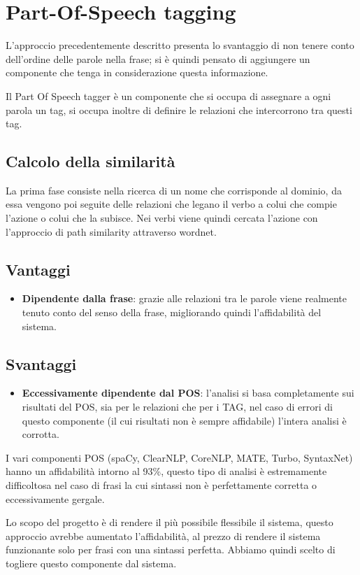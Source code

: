\documentclass[twoside]{supsistudent}
\begin{document}
\section{Part-Of-Speech tagging}
L'approccio precedentemente descritto presenta lo svantaggio di non tenere conto dell'ordine delle parole nella frase; si è quindi pensato di aggiungere un componente che tenga in considerazione questa informazione.

Il Part Of Speech tagger è un componente che si occupa di assegnare a ogni parola un tag, si occupa inoltre di definire le relazioni che intercorrono tra questi tag.\cite{pos}\cite{posCategories}
\subsection{Calcolo della similarità}
La prima fase consiste nella ricerca di un nome che corrisponde al dominio, da essa vengono poi seguite delle relazioni che legano il verbo a colui che compie l'azione o colui che la subisce. Nei verbi viene quindi cercata l'azione con l'approccio di path similarity attraverso wordnet.
\subsection{Vantaggi}
\begin{itemize}
  \item \textbf{Dipendente dalla frase}: grazie alle relazioni tra le parole viene realmente tenuto conto del senso della frase, migliorando quindi l'affidabilità del sistema.
\end{itemize}
\subsection{Svantaggi}
\begin{itemize}
  \item \textbf{Eccessivamente dipendente dal POS}: l'analisi si basa completamente sui risultati del POS, sia per le relazioni che per i TAG, nel caso di errori di questo componente (il cui risultati non è sempre affidabile) l'intera analisi è corrotta.
\end{itemize}
I vari componenti POS (spaCy, ClearNLP, CoreNLP, MATE, Turbo, SyntaxNet) hanno un affidabilità intorno al 93\%\cite{POS_scores}, questo tipo di analisi è estremamente difficoltosa nel caso di frasi la cui sintassi non è perfettamente corretta o eccessivamente gergale.  

Lo scopo del progetto è di rendere il più possibile flessibile il sistema, questo approccio avrebbe aumentato l'affidabilità, al prezzo di rendere il sistema funzionante solo per frasi con una sintassi perfetta. Abbiamo quindi scelto di togliere questo componente dal sistema.
\newpage
\end{document}
